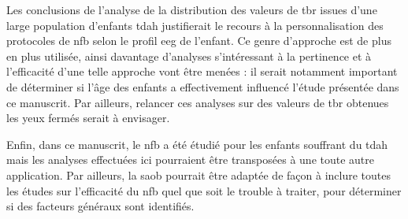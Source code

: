 Les conclusions de l'analyse de la distribution des valeurs de \gls{tbr} issues d'une large population d'enfants \gls{tdah} justifierait le recours à la 
personnalisation des protocoles de \gls{nfb} selon le profil \gls{eeg} de l'enfant. Ce genre d'approche est de plus en plus utilisée, ainsi davantage d'analyses s'intéressant
à la pertinence et à l'efficacité d'une telle approche vont être menées : il serait notamment important de déterminer si l'âge des enfants a effectivement influencé l'étude
présentée dans ce manuscrit. Par ailleurs, relancer ces analyses sur des valeurs de \gls{tbr} obtenues les yeux fermés serait à envisager. 

Enfin, dans ce manuscrit, le \gls{nfb} a été étudié pour les enfants souffrant du \gls{tdah} mais les analyses effectuées ici pourraient être transposées à une toute autre application.
Par ailleurs, la \gls{saob} pourrait être adaptée de façon à inclure toutes les études sur l'efficacité du \gls{nfb} quel que soit le trouble à traiter, pour déterminer si des facteurs
généraux sont identifiés. 
